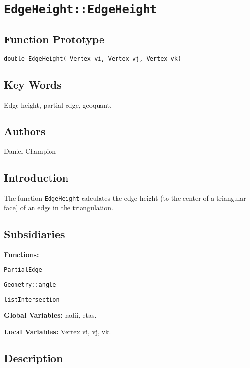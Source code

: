                       

\section*{\texttt{EdgeHeight::EdgeHeight\label{Edge Height FUNCTION}}}

\subsection*{Function Prototype}

\texttt{double EdgeHeight( Vertex vi, Vertex vj, Vertex vk)}

\subsection*{Key Words}

Edge height, partial edge, geoquant.

\subsection*{Authors}

Daniel Champion

\subsection*{Introduction}

The function \texttt{EdgeHeight} calculates the edge height (to the center
of a triangular face) of an edge in the triangulation. \ 

\subsection*{Subsidiaries}

\textbf{Functions:}

\qquad \texttt{PartialEdge}

\qquad\texttt{Geometry::angle}

\qquad\texttt{listIntersection}

\textbf{Global Variables:} radii, etas.

\textbf{Local Variables:} Vertex vi, vj, vk.

\subsection*{Description}

